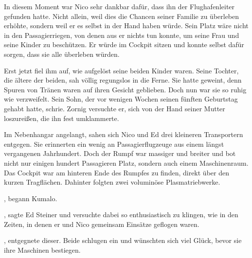 \par

In diesem Moment war Nico sehr dankbar dafür, dass ihn der Flughafenleiter gefunden hatte. Nicht allein, weil dies die Chancen seiner Familie zu überleben erhöhte, sondern weil er es selbst in der Hand haben würde. Sein Platz wäre nicht in den Passagierriegen, von denen aus er nichts tun konnte, um seine Frau und seine Kinder zu beschützen. Er würde im Cockpit sitzen und konnte selbst dafür sorgen, dass sie alle überleben würden.

\par

Erst jetzt fiel ihm auf, wie aufgelöst seine beiden Kinder waren. Seine Tochter, die ältere der beiden, sah völlig regungslos in die Ferne. Sie hatte geweint, denn Spuren von Tränen waren auf ihren Gesicht geblieben. Doch nun war sie so ruhig wie verzweifelt. Sein Sohn, der vor wenigen Wochen seinen fünften Geburtstag gehabt hatte, schrie. Zornig versuchte er, sich von der Hand seiner Mutter loszureißen, die ihn fest umklammerte.

\par

Im Nebenhangar angelangt, sahen sich Nico und Ed drei kleineren Transportern entgegen. Sie erinnerten ein wenig an Passagierflugzeuge aus einem längst vergangenen Jahrhundert. Doch der Rumpf war massiger und breiter und bot nicht nur einigen hundert Passagieren Platz, sondern auch einem Maschinenraum. Das Cockpit war am hinteren Ende des Rumpfes zu finden, direkt über den kurzen Tragflächen. Dahinter folgten zwei voluminöse Plasmatriebwerke.

\par

, begann Kumalo. 

\par

, sagte Ed Steiner und versuchte dabei so enthusiastisch zu klingen, wie in den Zeiten, in denen er und Nico gemeinsam Einsätze geflogen waren.

\par

, entgegnete dieser. Beide schlugen ein und wünschten sich viel Glück, bevor sie ihre Maschinen bestiegen.

\par

